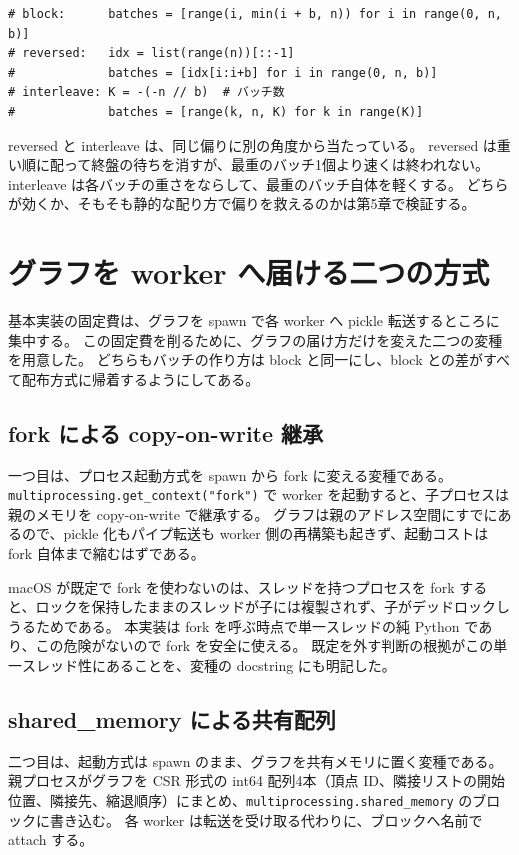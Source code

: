 \begin{verbatim}
# block:      batches = [range(i, min(i + b, n)) for i in range(0, n, b)]
# reversed:   idx = list(range(n))[::-1]
#             batches = [idx[i:i+b] for i in range(0, n, b)]
# interleave: K = -(-n // b)  # バッチ数
#             batches = [range(k, n, K) for k in range(K)]
\end{verbatim}

reversed と interleave は、同じ偏りに別の角度から当たっている。
reversed は重い順に配って終盤の待ちを消すが、最重のバッチ1個より速くは終われない。
interleave は各バッチの重さをならして、最重のバッチ自体を軽くする。
どちらが効くか、そもそも静的な配り方で偏りを救えるのかは第5章で検証する。

\section{グラフを worker へ届ける二つの方式}

基本実装の固定費は、グラフを spawn で各 worker へ pickle 転送するところに集中する。
この固定費を削るために、グラフの届け方だけを変えた二つの変種を用意した。
どちらもバッチの作り方は block と同一にし、block との差がすべて配布方式に帰着するようにしてある。

\subsection*{fork による copy-on-write 継承}

一つ目は、プロセス起動方式を spawn から fork に変える変種である。
\verb|multiprocessing.get_context("fork")| で worker を起動すると、子プロセスは親のメモリを copy-on-write で継承する。
グラフは親のアドレス空間にすでにあるので、pickle 化もパイプ転送も worker 側の再構築も起きず、起動コストは fork 自体まで縮むはずである。

macOS が既定で fork を使わないのは、スレッドを持つプロセスを fork すると、ロックを保持したままのスレッドが子には複製されず、子がデッドロックしうるためである。
本実装は fork を呼ぶ時点で単一スレッドの純 Python であり、この危険がないので fork を安全に使える。
既定を外す判断の根拠がこの単一スレッド性にあることを、変種の docstring にも明記した。

\subsection*{shared\_memory による共有配列}

二つ目は、起動方式は spawn のまま、グラフを共有メモリに置く変種である。
親プロセスがグラフを CSR 形式の int64 配列4本（頂点 ID、隣接リストの開始位置、隣接先、縮退順序）にまとめ、\verb|multiprocessing.shared_memory| のブロックに書き込む。
各 worker は転送を受け取る代わりに、ブロックへ名前で attach する。

